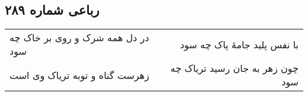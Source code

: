 \begin{center}
\section*{رباعی شماره ۲۸۹}
\label{sec:sh289}
\begin{longtable}{l p{0.5cm} r}
در دل همه شرک و روی بر خاک چه سود
&&
با نفس پلید جامهٔ پاک چه سود
\\
زهرست گناه و توبه تریاک وی است
&&
چون زهر به جان رسید تریاک چه سود
\\
\end{longtable}
\end{center}
